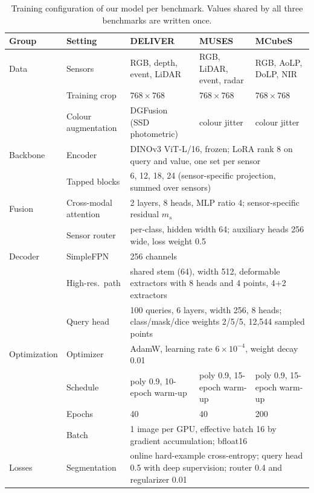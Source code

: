 \begin{table}[p]
\caption{Training configuration of our model per benchmark. Values shared by all three benchmarks are written once.}
\label{tab:train}
\centering\tabsetup
\begin{tabular*}{\textwidth}{@{\extracolsep{\fill}}lllll@{}}
\toprule
Group & Setting & DELIVER & MUSES & MCubeS \\
\midrule
Data & Sensors & RGB, depth, event, LiDAR & RGB, LiDAR, event, radar & RGB, AoLP, DoLP, NIR \\
 & Training crop & $768\times768$ & $768\times768$ & $768\times768$ \\
 & Colour augmentation & DGFusion~\cite{dgfusion2026} (SSD photometric) & colour jitter & colour jitter \\
\midrule
Backbone & Encoder & \multicolumn{3}{l}{DINOv3 ViT-L/16, frozen; LoRA rank 8 on query and value, one set per sensor} \\
 & Tapped blocks & \multicolumn{3}{l}{6, 12, 18, 24 (sensor-specific projection, summed over sensors)} \\
\midrule
Fusion & Cross-modal attention & \multicolumn{3}{l}{2 layers, 8 heads, MLP ratio 4; sensor-specific residual $m_s$} \\
 & Sensor router & \multicolumn{3}{l}{per-class, hidden width 64; auxiliary heads 256 wide, loss weight 0.5} \\
\midrule
Decoder & SimpleFPN & \multicolumn{3}{l}{256 channels} \\
 & High-res.\ path & \multicolumn{3}{l}{shared stem (64), width 512, deformable extractors with 8 heads and 4 points, 4+2 extractors} \\
 & Query head & \multicolumn{3}{l}{100 queries, 6 layers, width 256, 8 heads; class/mask/dice weights 2/5/5, 12{,}544 sampled points} \\
\midrule
Optimization & Optimizer & \multicolumn{3}{l}{AdamW, learning rate $6\times10^{-4}$, weight decay 0.01} \\
 & Schedule & poly 0.9, 10-epoch warm-up & poly 0.9, 15-epoch warm-up & poly 0.9, 15-epoch warm-up \\
 & Epochs & 40 & 40 & 200 \\
 & Batch & \multicolumn{3}{l}{1 image per GPU, effective batch 16 by gradient accumulation; bfloat16} \\
\midrule
Losses & Segmentation & \multicolumn{3}{l}{online hard-example cross-entropy; query head 0.5 with deep supervision; router 0.4 and regularizer 0.01} \\

\end{tabular*}
\end{table}
